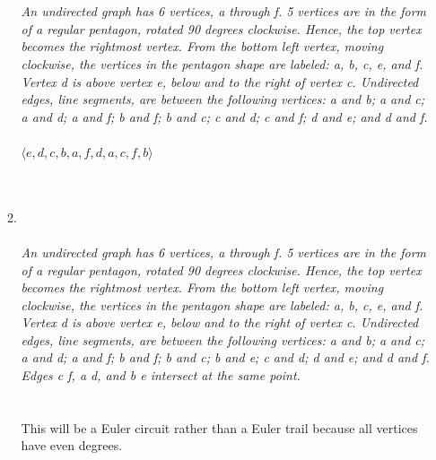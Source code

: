\documentclass{amsart}
\theoremstyle{definition}
\theoremstyle{Exercise}
\theoremstyle{remark}
\theoremstyle{rule}
\numberwithin{equation}{section}
\begin{document}
\begin{enumerate}[label=(\alph*)]
\begin{enumerate}[label=(\roman*)]
{}
\\\\
{\color{blue}{\bf Figure 11:} \emph{An undirected graph has 6 vertices, a through f. 5 vertices are in the form of a regular pentagon, rotated 90 degrees clockwise. Hence, the top vertex becomes the rightmost vertex. From the bottom left vertex, moving clockwise, the vertices in the pentagon shape are labeled: a, b, c, e, and f. Vertex d is above vertex e, below and to the right of vertex c. Undirected edges, line segments, are between the following vertices: a and b; a and c; a and d; a and f; b and f; b and c; c and d; c and f; d and e; and d and f.
}
}
\\\\
$\langle e, d, c, b, a, f, d, a, c, f, b \rangle$\\
\\\\
\item {}
\\\\
{\color{blue}{\bf Figure 12:} \emph{An undirected graph has 6 vertices, a through f. 5 vertices are in the form of a regular pentagon, rotated 90 degrees clockwise. Hence, the top vertex becomes the rightmost vertex. From the bottom left vertex, moving clockwise, the vertices in the pentagon shape are labeled: a, b, c, e, and f. Vertex d is above vertex e, below and to the right of vertex c. Undirected edges, line segments, are between the following vertices: a and b; a and c; a and d; a and f; b and f; b and c; b and e; c and d; d and e; and d and f. Edges c f, a d, and b e intersect at the same point.
\\
}
}
\\\\
This will be a Euler circuit rather than a Euler trail because all vertices have even degrees.

\end{enumerate}
\end{enumerate}
 \newpage
\end{document}

